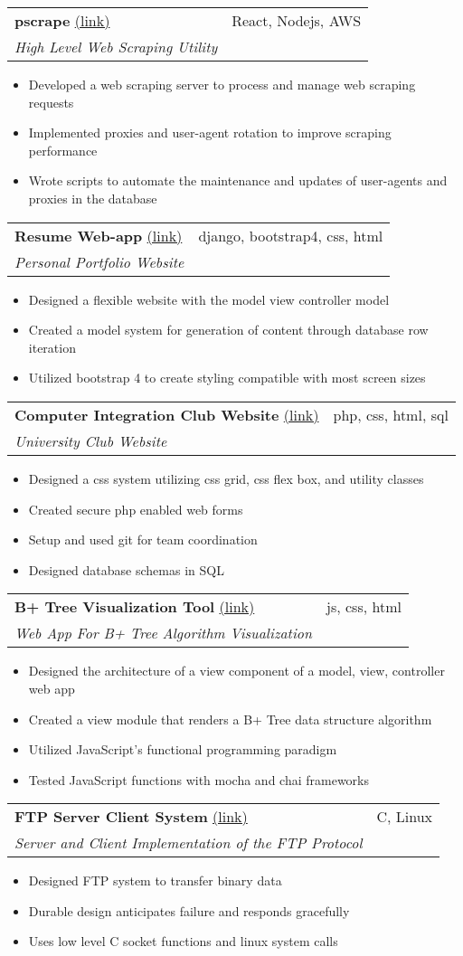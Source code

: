 \documentclass[letterpaper,11pt]{article}
\makeatletter
\newcommand{\resumeItem}[2]{
  \item\small{
    \textbf{#1}{ #2 \vspace{-2pt}}
  }
}
\newcommand{\resumeSubheading}[5]{
  \vspace{-1pt}\item
    \begin{tabular*}{0.97\textwidth}[t]{l@{\extracolsep{\fill}}r}
      \textbf{#1} #2 & #3 \\
      \textit{\small#4} & \textit{\small #5} \\
    \end{tabular*}\vspace{-5pt}
}
\newcommand{\resumeSubItem}[2]{\resumeItem{#1}{#2}\vspace{-4pt}}
\newcommand{\resumeItemListStart}{\begin{itemize}[leftmargin=*]}
\newcommand{\resumeItemListEnd}{\end{itemize}\vspace{-5pt}}
\makeatother
\begin{document}
  \resumeSubheading{pscrape}{\href{https://github.com/munikeraragon/p_scrape}{(link)}}{React, Nodejs, AWS}{High Level Web Scraping Utility}{}
    \resumeItemListStart
      \resumeSubItem{}{Developed a web scraping server to process and manage web scraping requests}
      \resumeSubItem{}{Implemented proxies and user-agent rotation to improve scraping performance}
      \resumeSubItem{}{Wrote scripts to automate the maintenance and updates of user-agents and proxies in the database}
    \resumeItemListEnd

  \resumeSubheading{Resume Web-app}{\href{http://www.treverhibbs.com/}{(link)}}{django, bootstrap4, css, html}{Personal Portfolio Website}{}
  \resumeItemListStart
    \resumeSubItem{}{Designed a flexible website with the model view controller model}
    \resumeSubItem{}{Created a model system for generation of content through database row iteration}
    \resumeSubItem{}{Utilized bootstrap 4 to create styling compatible with most screen sizes}
  \resumeItemListEnd

  \resumeSubheading{Computer Integration Club Website}{\href{http://www6.encs.vancouver.wsu.edu/}{(link)}}{php, css, html, sql}{University Club Website}{}
  \resumeItemListStart
    \resumeSubItem{}{Designed a css system utilizing css grid, css flex box, and utility classes}
    \resumeSubItem{}{Created secure php enabled web forms}
    \resumeSubItem{}{Setup and used git for team coordination}
  \resumeSubItem{}{Designed database schemas in SQL}
  \resumeItemListEnd
  
  \resumeSubheading{B+ Tree Visualization Tool}{\href{https://github.com/TreverHibbs/BPlusTree}{(link)}}{js, css, html}{Web App For B+ Tree Algorithm Visualization}{}
  \resumeItemListStart
    \resumeSubItem{}{Designed the architecture of a view component of a model, view, controller web app}
    \resumeSubItem{}{Created a view module that renders a B+ Tree data structure algorithm}
    \resumeSubItem{}{Utilized JavaScript's functional programming paradigm}
  \resumeSubItem{}{Tested JavaScript functions with mocha and chai frameworks}
  \resumeItemListEnd

  \resumeSubheading{FTP Server Client System}{\href{https://github.com/dbutler12/FTP}{(link)}}{C, Linux}{Server and Client Implementation of the FTP Protocol}{}
    \resumeItemListStart
      \resumeSubItem{}{Designed FTP system to transfer binary data}
      \resumeSubItem{}{Durable design anticipates failure and responds gracefully}
      \resumeSubItem{}{Uses low level C socket functions and linux system calls}
    \resumeItemListEnd
\end{document}
